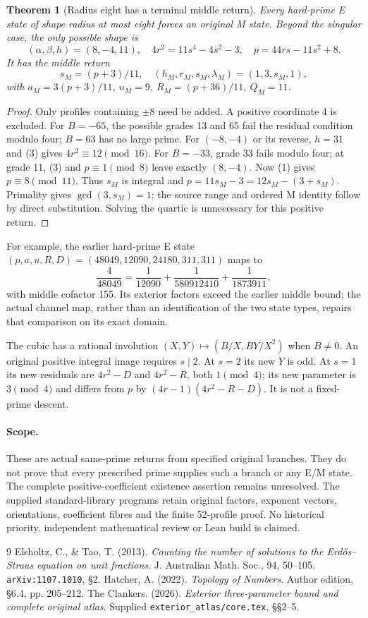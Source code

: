 \documentclass[11pt,reqno]{amsart}
\newtheorem{theorem}{Theorem}\newtheorem{lemma}[theorem]{Lemma}
\begin{document}
\begin{theorem}[Radius eight has a terminal middle return]
Every hard-prime E state of shape radius at most eight forces an original M
state. Beyond the singular case, the only possible shape is
\[
 (\alpha,\beta,h)=(8,-4,11),\quad
 4r^2=11s^4-4s^2-3,\quad p=44rs-11s^2+8.
\]
It has the middle return
\[
 s_M=(p+3)/11,\quad (h_M,r_M,s_M,\lambda_M)=(1,3,s_M,1),
\]
with $a_M=3(p+3)/11$, $u_M=9$, $R_M=(p+36)/11$, $Q_M=11$.
\end{theorem}
\begin{proof}
Only profiles containing $\pm8$ need be added. A positive coordinate 4 is
excluded. For $B=-65$, the possible grades 13 and 65 fail the residual condition
modulo four; $B=63$ has no large prime. For $(-8,-4)$ or its reverse, $h=31$
and (3) gives $4r^2\equiv12\pmod{16}$. For $B=-33$, grade 33 fails modulo four;
at grade 11, (3) and $p\equiv1\pmod8$ leave exactly $(8,-4)$.
Now (1) gives $p\equiv8\pmod{11}$. Thus $s_M$ is integral and
$p=11s_M-3=12s_M-(3+s_M)$. Primality gives $\gcd(3,s_M)=1$; the source range
and ordered M identity follow by direct substitution. Solving the quartic is
unnecessary for this positive return.
\end{proof}

For example, the earlier hard-prime E state
$(p,a,u,R,D)=(48049,12090,24180,311,311)$ maps to
\[
 \frac4{48049}=\frac1{12090}+\frac1{580912410}+\frac1{1873911},
\]
with middle cofactor 155. Its exterior factors exceed the earlier middle bound;
the actual channel map, rather than an identification of the two state types,
repairs that comparison on its exact domain.

The cubic has a rational involution $(X,Y)\mapsto(B/X,BY/X^2)$ when $B\ne0$.
An original positive integral image requires $s\mid2$. At $s=2$ its new $Y$ is
odd. At $s=1$ its new residuals are $4r^2-D$ and $4r^2-R$, both $1\pmod4$;
its new parameter is $3\pmod4$ and differs from $p$ by
$(4r-1)(4r^2-R-D)$. It is not a fixed-prime descent.

\paragraph{Scope.}
These are actual same-prime returns from specified original branches.
They do not prove that every prescribed prime supplies such a branch or any E/M
state. The complete positive-coefficient existence assertion remains unresolved.
The supplied standard-library programs retain original factors, exponent vectors,
orientations, coefficient fibres and the finite 52-profile proof. No historical
priority, independent mathematical review or Lean build is claimed.

\begin{thebibliography}{9}
 Elsholtz, C., \& Tao, T. (2013). \emph{Counting the number of solutions
to the Erd\H{o}s--Straus equation on unit fractions}. J. Australian Math. Soc.,
94, 50--105. \texttt{arXiv:1107.1010}, \S2.
 Hatcher, A. (2022). \emph{Topology of Numbers}. Author edition,
\S6.4, pp. 205--212.
 The Clankers. (2026). \emph{Exterior three-parameter bound and
complete original atlas}. Supplied \texttt{exterior\_atlas/core.tex}, \S\S2--5.
\end{thebibliography}
\end{document}
